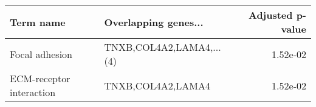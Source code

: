 \begin{tabular}{llr}
\toprule
               Term name &     Overlapping genes... &  Adjusted p-value \\
\midrule
          Focal adhesion & TNXB,COL4A2,LAMA4,...(4) &          1.52e-02 \\
ECM-receptor interaction &        TNXB,COL4A2,LAMA4 &          1.52e-02 \\
\bottomrule
\end{tabular}
